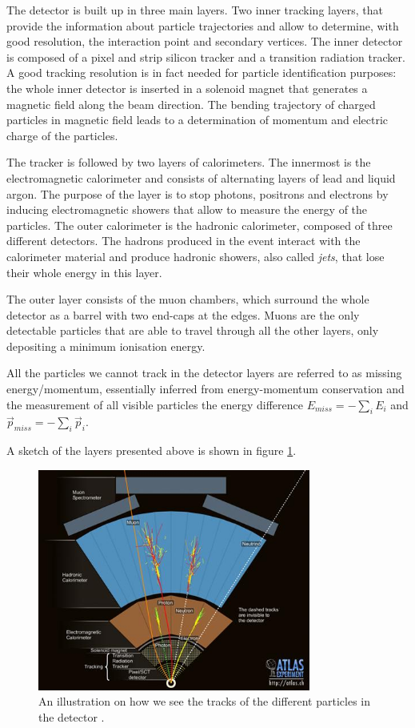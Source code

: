 The detector is built up in three main layers. Two inner tracking layers, that provide the information about particle trajectories and allow to determine, with good resolution, the interaction point and secondary vertices. The inner detector is composed of a pixel and strip silicon tracker and a transition radiation tracker. A good tracking resolution is in fact needed for particle identification purposes: the whole inner detector is inserted in a solenoid magnet that generates a magnetic field along the beam direction. The bending trajectory of charged particles in magnetic field leads to a determination of momentum and electric charge of the particles.

The tracker is followed by two layers of calorimeters. The innermost is the electromagnetic calorimeter and consists of alternating layers of lead and liquid argon. The purpose of the layer is to stop photons, positrons and electrons by inducing electromagnetic showers that allow to measure the energy of the particles. The outer calorimeter is the hadronic calorimeter, composed of three different detectors. The hadrons produced in the event interact with the calorimeter material and produce hadronic showers, also called \textit{jets}, that lose their whole energy in this layer. 

The outer layer consists of the muon chambers, which surround the whole detector as a barrel with two end-caps at the edges. Muons are the only detectable particles that are able to travel through all the other layers, only depositing a minimum ionisation energy. 

All the particles we cannot track in the detector layers are referred to as missing energy/momentum, essentially inferred from energy-momentum conservation and the measurement of all visible particles the energy difference $E_{miss} = -\sum_i E_i$ and $\Vec{p}_{miss} = -\sum_i \Vec{p}_i$. 

A sketch of the layers presented above is shown in figure \ref{fig:tracks}.

\begin{figure}[H]
    \centering
    \includegraphics[width = 0.8\textwidth]{Figures/FromOnline/tracks.jpg}
    \caption{An illustration on how we see the tracks of the different particles in the detector \cite{tracks}.}
    \label{fig:tracks}
\end{figure}


